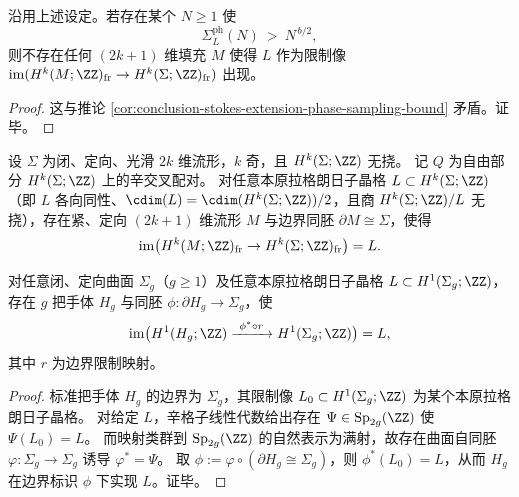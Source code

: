 \begin{corollary}\label{cor:conclusion-stokes-extension-obstruction-certificate}
沿用上述设定。若存在某个 \(N\ge 1\) 使
\[
\Sigma_{L}^{\mathrm{ph}}(N)\ >\ N^{\,b/2},
\]
则不存在任何 \((2k+1)\) 维填充 \(M\) 使得 \(L\) 作为限制像 \(\operatorname{im}(H^k(M;\ZZ)_{\mathrm{fr}}\to H^k(\Sigma;\ZZ)_{\mathrm{fr}})\) 出现。
\end{corollary}

\begin{proof}
这与推论 \ref{cor:conclusion-stokes-extension-phase-sampling-bound} 矛盾。证毕。
\end{proof}

\begin{conjecture}\label{conj:conclusion-lagrangian-realizability}
设 \(\Sigma\) 为闭、定向、光滑 \(2k\) 维流形，\(k\) 奇，且 \(H^k(\Sigma;\ZZ)\) 无挠。
记 \(Q\) 为自由部分 \(H^k(\Sigma;\ZZ)\) 上的辛交叉配对。
对任意本原拉格朗日子晶格 \(L\subset H^k(\Sigma;\ZZ)\)（即 \(L\) 各向同性、\(\cdim(L)=\cdim(H^k(\Sigma;\ZZ))/2\)，且商 \(H^k(\Sigma;\ZZ)/L\) 无挠），存在紧、定向 \((2k+1)\) 维流形 \(M\) 与边界同胚 \(\partial M\cong \Sigma\)，使得
\[
\operatorname{im}\bigl(H^k(M;\ZZ)_{\mathrm{fr}}\to H^k(\Sigma;\ZZ)_{\mathrm{fr}}\bigr)=L.
\]
\end{conjecture}

\begin{theorem}\label{thm:conclusion-surface-lagrangian-realizability}
对任意闭、定向曲面 \(\Sigma_g\)（\(g\ge 1\)）及任意本原拉格朗日子晶格 \(L\subset H^1(\Sigma_g;\ZZ)\)，存在 \(g\) 把手体 \(H_g\) 与同胚 \(\phi:\partial H_g\to \Sigma_g\)，使
\[
\operatorname{im}\bigl(H^1(H_g;\ZZ)\xrightarrow{\ \phi^\ast\circ r\ } H^1(\Sigma_g;\ZZ)\bigr)=L,
\]
其中 \(r\) 为边界限制映射。
\end{theorem}

\begin{proof}
标准把手体 \(H_g\) 的边界为 \(\Sigma_g\)，其限制像 \(L_0\subset H^1(\Sigma_g;\ZZ)\) 为某个本原拉格朗日子晶格。
对给定 \(L\)，辛格子线性代数给出存在 \(\Psi\in \mathrm{Sp}_{2g}(\ZZ)\) 使 \(\Psi(L_0)=L\)。
而映射类群到 \(\mathrm{Sp}_{2g}(\ZZ)\) 的自然表示为满射，故存在曲面自同胚 \(\varphi:\Sigma_g\to\Sigma_g\) 诱导 \(\varphi^\ast=\Psi\)。
取 \(\phi:=\varphi\circ(\partial H_g\cong \Sigma_g)\)，则 \(\phi^\ast(L_0)=L\)，从而 \(H_g\) 在边界标识 \(\phi\) 下实现 \(L\)。证毕。
\end{proof}

\endinput
